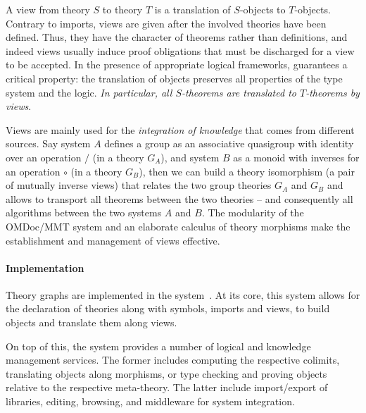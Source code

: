 A view from theory $S$ to theory $T$ is a translation of $S$-objects to $T$-objects.
Contrary to imports, views are given after the involved theories have been defined.  Thus,
they have the character of theorems rather than definitions, and indeed views usually
induce proof obligations that must be discharged for a view to be accepted.  In the
presence of appropriate logical frameworks, \MMT guarantees a critical property: the
translation of objects preserves all properties of the type system and the logic.
\emph{In particular, all $S$-theorems are translated to $T$-theorems by views}.

Views are mainly used for the \emph{integration of knowledge} that comes from different
sources. Say system $A$ defines a group as an associative quasigroup with identity over an
operation $/$  (in a theory $G_A$), and system $B$ as a monoid with inverses for an
operation $\circ$ (in a theory $G_B$), then we can build a theory isomorphism (a pair of
mutually inverse views) that relates the two group theories $G_A$ and $G_B$ and allows to
transport all theorems between the two theories -- and consequently all algorithms between
the two systems $A$ and $B$. The modularity of the OMDoc/MMT system and an elaborate
calculus of theory morphisms make the establishment and management of views effective.

\paragraph{Implementation}
Theory graphs are implemented in the \MMT system~\cite{Rabe:MAGMS13,uniformal:on}.
At its core, this system allows for the declaration of theories along with symbols, imports and views, to build objects and translate them along views.

On top of this, the \MMT system provides a number of logical and knowledge management services.
The former includes computing the respective colimits, translating objects along morphisms, or type checking and proving objects relative to the respective meta-theory.
The latter include import/export of libraries, editing, browsing, and middleware for system integration.


